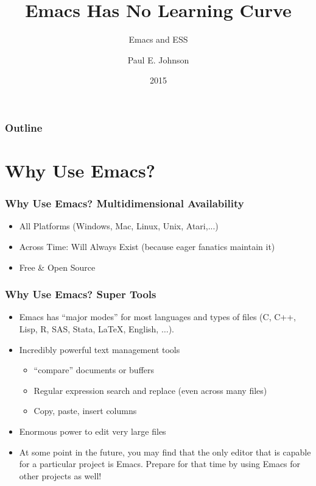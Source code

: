 \documentclass[11pt,english]{beamer}
\newcommand\makebeamertitle{\frame{\maketitle}}
\begin{document}

%


\title[Emacs]{Emacs Has No Learning Curve }

\subtitle{Emacs and ESS}

\author{Paul E. Johnson \and {}}




\date[2015]{2015}

\makebeamertitle


\begin{frame} 
\frametitle{Outline}

\tableofcontents{}

\end{frame}

\section{Why Use Emacs?}

\begin{frame}
  \frametitle{Why Use Emacs? Multidimensional Availability}
  \begin{itemize}
  \item All Platforms (Windows, Mac, Linux, Unix, Atari,...)
  \item Across Time: Will Always Exist (because eager fanatics maintain it)
  \item Free \& Open Source
  \end{itemize}
\end{frame}

\begin{frame}
  \frametitle{Why Use Emacs? Super Tools}
  \begin{itemize}
  \item Emacs has ``major modes'' for most languages and types of files
    (C, C++, Lisp, R, SAS, Stata, \LaTeX{}, English, $\ldots$). 
  \item Incredibly powerful text management tools

    \begin{itemize}
    \item ``compare'' documents or buffers
    \item Regular expression search and replace (even across many files)
    \item Copy, paste, insert columns
    \end{itemize}
  \item Enormous power to edit very large files
  \item At some point in the future, you may find that the only editor
    that is capable for a particular project is Emacs. Prepare for
    that time by using Emacs for other projects as well! 
  \end{itemize}
\end{frame}
\end{document}
